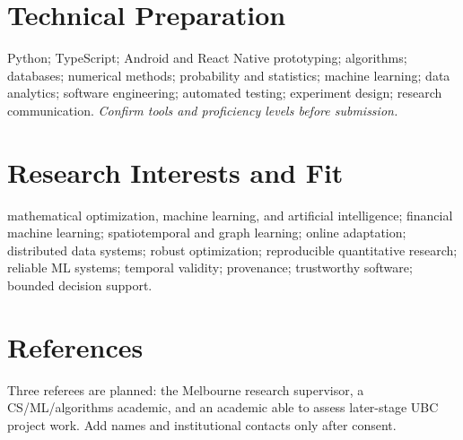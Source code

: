 \documentclass[11pt]{article}
\begin{document}
\section*{Technical Preparation}
Python; TypeScript; Android and React Native prototyping; algorithms; databases; numerical methods; probability and statistics; machine learning; data analytics; software engineering; automated testing; experiment design; research communication. \textit{Confirm tools and proficiency levels before submission.}

\section*{Research Interests and Fit}
mathematical optimization, machine learning, and artificial intelligence; financial machine learning; spatiotemporal and graph learning; online adaptation; distributed data systems; robust optimization; reproducible quantitative research; reliable ML systems; temporal validity; provenance; trustworthy software; bounded decision support.

\section*{References}
Three referees are planned: the Melbourne research supervisor, a CS/ML/algorithms academic, and an academic able to assess later-stage UBC project work. Add names and institutional contacts only after consent.
\end{document}
